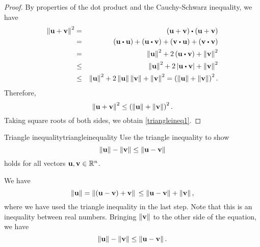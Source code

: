 \begin{proof}
  By properties of the dot product and the Cauchy-Schwarz inequality,
  we have
  \begin{eqnarray*}
    \norm{\vect{u}+\vect{v}}^{2}
    &=& \tup{\vect{u}+\vect{v}}\dotprod\tup{\vect{u}+\vect{v}} \\
    & =&\tup{\vect{u}\dotprod\vect{u}}+\tup{\vect{u}\dotprod\vect{v}}+\tup{\vect{v}\dotprod\vect{u}}+\tup{\vect{v}\dotprod\vect{v}} \\
    &=&\norm{\vect{u}}^{2}+2\tup{\vect{u}\dotprod\vect{v}}+\norm{\vect{v}}^{2} \\
    &\leq& \norm{\vect{u}}^{2}+2\abs{\vect{u}\dotprod\vect{v}}+\norm{\vect{v}}^{2} \\
    &\leq& \norm{\vect{u}}^{2}+2\norm{\vect{u}}\norm{\vect{v}}+\norm{\vect{v}}^{2} =\tup{\norm{\vect{u}}+\norm{\vect{v}}}^{2}.
  \end{eqnarray*}
  Therefore,
  \begin{equation*}
    \left\|\mbox{\bf u}+\mbox{\bf v}\right\|^{2}\leq\left(\left\|\mbox{\bf u}\right\|+\left\|\mbox{\bf v}\right\|\right)^{2}.
  \end{equation*}
  Taking square roots of both sides, we obtain \eqref{triangleineq1}.
\end{proof}

\begin{example}{Triangle inequality}{triangleinequality}
  Use the triangle inequality to show
  \begin{equation*}
    \left\|\mbox{\bf u}\right\| -\left\|\mbox{\bf v}\right\| \leq \left\|\mbox{\bf u}-\mbox{\bf v}\right\|
  \end{equation*}
  holds for all vectors $\mbox{\bf u},\mbox{\bf v}\in\mathbb{R}^n$.
\end{example}

\begin{solution}
  We have
  \begin{equation*}
    \left\|\mbox{\bf u}\right\|
    = \left\|(\mbox{\bf u}-\mbox{\bf v})+\mbox{\bf v}\right\| \\
    \leq \left\|\mbox{\bf u}-\mbox{\bf v}\right\|+\left\|\mbox{\bf v}\right\|,
  \end{equation*}
  where we have used the triangle inequality in the last step. Note
  that this is an inequality between real numbers. Bringing
  $\left\|\mbox{\bf v}\right\|$ to the other side of the equation, we have
  \begin{equation*}
    \left\|\mbox{\bf u}\right\| - \left\|\mbox{\bf v}\right\| \leq \left\|\mbox{\bf u}-\mbox{\bf v}\right\|.
  \end{equation*}
\end{solution}
